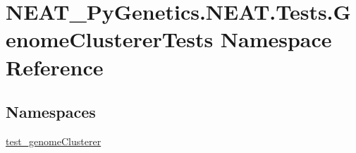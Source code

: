 \hypertarget{namespaceNEAT__PyGenetics_1_1NEAT_1_1Tests_1_1GenomeClustererTests}{}\section{N\+E\+A\+T\+\_\+\+Py\+Genetics.\+N\+E\+A\+T.\+Tests.\+Genome\+Clusterer\+Tests Namespace Reference}
\label{namespaceNEAT__PyGenetics_1_1NEAT_1_1Tests_1_1GenomeClustererTests}
\subsection*{Namespaces}
\begin{DoxyCompactItemize}
\item 
 \hyperlink{namespaceNEAT__PyGenetics_1_1NEAT_1_1Tests_1_1GenomeClustererTests_1_1test__genomeClusterer}{test\+\_\+genome\+Clusterer}
\end{DoxyCompactItemize}
